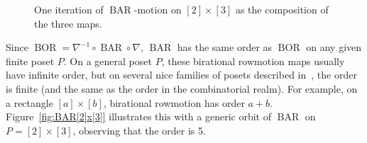 \documentclass[ALCO,ThmDefs,Unicode,epreuves]{cedram}
\newcommand{\down}{\nabla}
\DeclareMathOperator{\BAR}{BAR}
\DeclareMathOperator{\BOR}{BOR}
\begin{document}
\begin{figure}[htb]
\caption{One iteration of $\BAR$-motion on $[2]\times[3]$ as the composition of the three maps.}
\label{fig:2x3-BAR}
\end{figure}

\begin{exam}\label{ex:BAR[2]x[3]}
Since $\BOR=\down^{-1} \circ \BAR \circ \down$,
$\BAR$ has the same order as $\BOR$ on any given
finite poset $P$.
On a general poset $P$, these birational rowmotion maps usually have infinite order, but on several nice families of posets described in~\cite{GrRo15,GrRo16,hopkins2019minuscule}, the order is finite (and the same as the order in the combinatorial realm).
For example, on a rectangle $[a]\times[b]$,
birational rowmotion has order $a+b$.
Figure~\ref{fig:BAR[2]x[3]} illustrates this with a generic orbit of $\BAR$ on $P=[2]\times[3]$, observing that the order is 5.
\end{exam}
\end{document}
